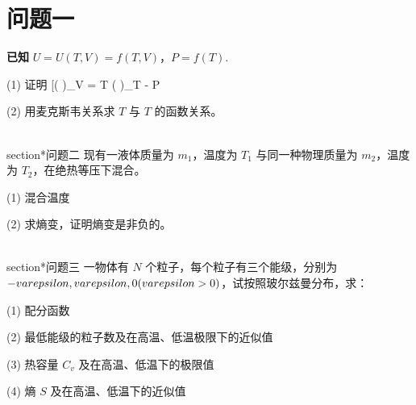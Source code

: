 \section{问题一}
\textbf{已知} $U = U(T, V) = f(T, V)$，$P = f(T)$.

(1) 证明
[\left( \right)_V = T \left(  \right)_T - P\]

(2) 用麦克斯韦关系求 $T$ 与 $T$ 的函数关系。

\\section*{问题二}
现有一液体质量为 $m_1$，温度为 $T_1$ 与同一种物理质量为 $m_2$，温度为 $T_2$，在绝热等压下混合。

(1) 混合温度

(2) 求熵变，证明熵变是非负的。

\\section*{问题三}
一物体有 $N$ 个粒子，每个粒子有三个能级，分别为 $-\\varepsilon, \\varepsilon, 0 (\\varepsilon > 0)$，试按照玻尔兹曼分布，求：

(1) 配分函数

(2) 最低能级的粒子数及在高温、低温极限下的近似值

(3) 热容量 $C_v$ 及在高温、低温下的极限值

(4) 熵 $S$ 及在高温、低温下的近似值